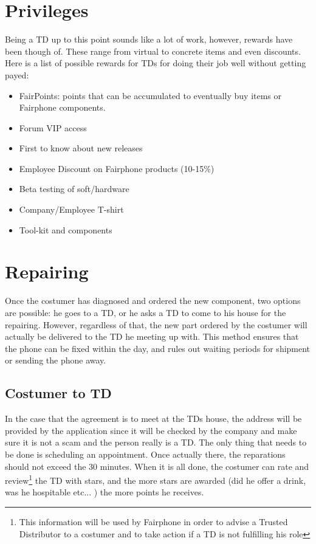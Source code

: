 \documentclass[final]{scrreprt} %
\begin{document}
\section{Privileges} 
Being a TD up to this point sounds like a lot of work, however, rewards have been though of. These range from virtual to concrete items and even discounts. Here is a list of possible rewards for TDs for doing their job well without getting payed:

\begin{itemize}
	\item FairPoints: points that can be accumulated to eventually buy items or Fairphone components.
	\item Forum VIP access
	\item First to know about new releases
	\item Employee Discount on Fairphone products (10-15\%)
	\item Beta testing of soft/hardware
	\item Company/Employee T-shirt
	\item Tool-kit and components
	\end{itemize}

\section{Repairing}
Once the costumer has diagnosed and ordered the new component, two options are possible: he goes to a TD, or he asks a TD to come to his house for the repairing. However, regardless of that, the new part ordered by the costumer will actually be delivered to the TD he meeting up with. This method ensures that the phone can be fixed within the day, and rules out waiting periods for shipment or sending the phone away.

\subsection{Costumer to TD} \label{subsec:costumer2td}
In the case that the agreement is to meet at the TDs house, the address will be provided by the application since it will be checked by the company and make sure it is not a scam and the person really is a TD. The only thing that needs to be done is scheduling an appointment. Once actually there, the reparations should not exceed the 30 minutes. When it is all done, the costumer can rate and review\footnote{This information will be used by Fairphone in order to advise a Trusted Distributor to a costumer and to take action if a TD is not fulfilling his role} the TD with stars, and the more stars are awarded (did he offer a drink, was he hospitable etc... ) the more points he receives.
\end{document}
